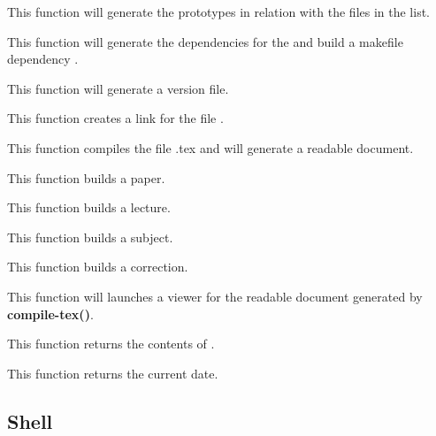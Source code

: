          {This function will generate the prototypes in relation with
	   the files in the list.}

         {This function will generate the dependencies for the
	    and build a makefile dependency
	   .}

         {This function will generate a version file.}

         {This function creates a link  for the file
	   .}

         {This function compiles the file .tex and
	   will generate a readable document.}

         {This function builds a paper.}

         {This function builds a lecture.}

         {This function builds a subject.}

         {This function builds a correction.}

         {This function will launches a viewer for the readable document
	   generated by \textbf{compile-tex()}.}

         {This function returns the contents of .}

         {This function returns the current date.}

%
%

\subsection{Shell}

